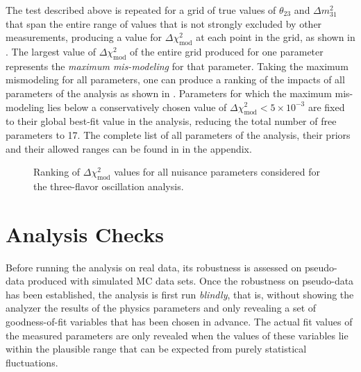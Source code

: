 The test described above is repeated for a grid of true values of $\theta_{23}$ and $\Delta m^2_{31}$ that span the entire range of values that is not strongly excluded by other measurements, producing a value for $\Delta \chi^2_{\mathrm{mod}}$ at each point in the grid, as shown in . The largest value of $\Delta \chi^2_{\mathrm{mod}}$ of the entire grid produced for one parameter represents the \emph{maximum mis-modeling} for that parameter. Taking the maximum mismodeling for all parameters, one can produce a ranking of the impacts of all parameters of the analysis as shown in . Parameters for which the maximum mis-modeling lies below a conservatively chosen value of $\Delta \chi^2_{\mathrm{mod}} < 5\times10^{-3}$ are fixed to their global best-fit value in the analysis, reducing the total number of free parameters to 17.
The complete list of all parameters of the analysis, their priors and their allowed ranges can be found in  in the appendix.
\begin{figure}
    \centering
    
    \caption{Ranking of $\Delta \chi^2_{\mathrm{mod}}$ values for all nuisance parameters considered for the three-flavor oscillation analysis.}
    \label{fig:systematic-impact-mismod-ranking}
\end{figure}

\section{Analysis Checks}
Before running the analysis on real data, its robustness is assessed on pseudo-data produced with simulated MC data sets.
Once the robustness on pseudo-data has been established, the analysis is first run \emph{blindly}, that is, without showing the analyzer the results of the physics parameters and only revealing a set of goodness-of-fit variables that has been chosen in advance.
The actual fit values of the measured parameters are only revealed when the values of these variables lie within the plausible range that can be expected from purely statistical fluctuations.

